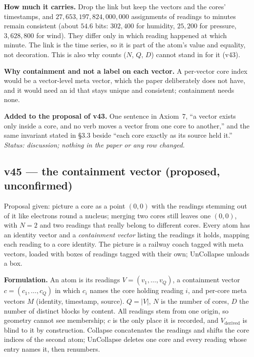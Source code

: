 \documentclass[11pt]{article}
\begin{document}
\textbf{How much it carries.} Drop the link but keep the vectors and the cores' timestamps, and $27{,}653{,}197{,}824{,}000{,}000$ assignments of readings to minutes remain consistent
(about $54.6$ bits: $302{,}400$ for humidity, $25{,}200$ for pressure, $3{,}628{,}800$ for wind). They differ only in which reading happened at which minute. The link is the time series, so it is part of the atom's value and
equality, not decoration. This is also why counts ($N$, $Q$, $D$) cannot stand in for it (v43).

\textbf{Why containment and not a label on each vector.} A per-vector core index would be a vector-level meta vector, which the paper deliberately does not have, and it would need an id that stays unique and consistent; containment needs none.

\textbf{Added to the proposal of v43.} One sentence in Axiom~7, ``a vector exists only inside a core, and no verb moves a vector from one core to another,'' and the same invariant stated in \S3.3 beside ``each core exactly as its source held it.''
\emph{Status: discussion; nothing in the paper or any row changed.}


\subsection*{v45 --- the containment vector (proposed, unconfirmed)}
Proposal given: picture a core as a point $(0,0)$ with the readings stemming out of it like electrons round a nucleus; merging two cores still leaves one $(0,0)$, with $N=2$ and two readings that
really belong to different cores. Every atom has an identity vector and a \emph{containment vector} listing the readings it holds, mapping each reading to a core identity. The picture is a railway coach tagged with
meta vectors, loaded with boxes of readings tagged with their own; UnCollapse unloads a box.

\textbf{Formulation.} An atom is its readings $V=(v_1,\ldots,v_Q)$, a containment vector $c=(c_1,\ldots,c_Q)$ in which $c_i$ names the core holding reading $i$, and per-core meta vectors $M$ (identity, timestamp, source).
$Q=\lvert V\rvert$, $N$ is the number of cores, $D$ the number of distinct blocks by content. All readings stem from one origin, so geometry cannot see membership; $c$ is the only place it is recorded, and
$V_{\text{derived}}$ is blind to it by construction. Collapse concatenates the readings and shifts the core indices of the second atom; UnCollapse deletes one core and every reading whose entry names it, then renumbers.
\end{document}
